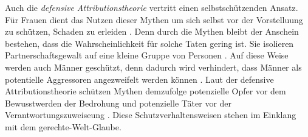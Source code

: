 Auch die \textit{defensive Attributionstheorie} vertritt einen selbstschützenden Ansatz. Für Frauen dient das Nutzen dieser Mythen um sich selbst vor der Vorstelluung zu schützen, Schaden zu erleiden \parencite{DVMAS, DVMAS_Peters}. Denn durch die Mythen bleibt der Anschein bestehen, dass die Wahrscheinlichkeit für solche Taten gering ist. Sie isolieren Partnerschaftsgewalt auf eine kleine Gruppe von Personen \parencite{DVMAS}. Auf diese Weise werden auch Männer geschützt, denn dadurch wird verhindert, dass Männer als potentielle Aggressoren angezweifelt werden können \parencite{DVMAS, DVMAS_Peters}. Laut der defensive Attributionstheorie schützen Mythen demzufolge potenzielle Opfer vor dem Bewusstwerden der Bedrohung und potenzielle Täter vor der Verantwortungszuweiseung \parencite{DVMAS_Peters}. Diese Schutzverhaltensweisen stehen im Einklang mit dem gerechte-Welt-Glaube.